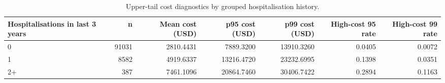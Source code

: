 \begin{table}
\caption{Upper-tail cost diagnostics by grouped hospitalisation history.}
\label{tab:02-tail-by-hospitalisation}
\begin{tabular}{lrrrrrr}
\toprule
Hospitalisations in last 3 years & n & Mean cost (USD) & p95 cost (USD) & p99 cost (USD) & High-cost 95 rate & High-cost 99 rate \\
\midrule
0 & 91031 & 2810.4431 & 7889.3200 & 13910.3260 & 0.0405 & 0.0072 \\
1 & 8582 & 4919.6337 & 13216.4720 & 23232.6995 & 0.1398 & 0.0351 \\
2+ & 387 & 7461.1096 & 20864.7460 & 30406.7422 & 0.2894 & 0.1163 \\
\bottomrule
\end{tabular}
\end{table}
